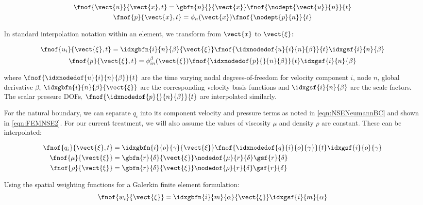 \begin{gather}
  \fnof{\vect{u}}{\vect{x},t}=\gbfn{n}{}{\vect{x}}\fnof{\nodept{\vect{u}}{n}}{t}\\
  \fnof{p}{\vect{x},t}=\phi_{n}({\vect{x}})\fnof{\nodept{p}{n}}{t}
\end{gather}

In standard interpolation notation within an element, we transform from $\vect{x}$ to $\vect{\xi}$:

\begin{gather}
  \fnof{u_{i}}{\vect{\xi},t}=\idxgbfn{i}{n}{\beta}{\vect{\xi}}
  \fnof{\idxnodedof{u}{i}{n}{\beta}}{t}\idxgsf{i}{n}{\beta}\\
  \fnof{p_{}}{\vect{\xi},t}=\phi_{in}^{\beta}({\vect{\xi}})
  \fnof{\idxnodedof{p}{}{n}{\beta}}{t}\idxgsf{i}{n}{\beta}
\end{gather}

where $\fnof{\idxnodedof{u}{i}{n}{\beta}}{t}$ are the time varying nodal degrees-of-freedom for velocity component $i$, node $n$, global derivative $\beta$, $\idxgbfn{i}{n}{\beta}{\vect{\xi}}$ are the corresponding velocity basis functions and $\idxgsf{i}{n}{\beta}$ are the scale factors. The scalar pressure DOFs, $\fnof{\idxnodedof{p}{}{n}{\beta}}{t}$ are interpolated similarly.

For the natural boundary, we can separate $q_i$ into its component velocity and pressure terms as noted in \ref{eqn:NSENeumannBC} and shown in \ref{eqn:FEMNSE2}. For our current treatment, we will also assume the values of viscosity $\mu$ and density $\rho$ are constant. These can be interpolated:

\begin{equation}
  \begin{split}
    \fnof{q_{i}}{\vect{\xi},t} &= \idxgbfn{i}{o}{\gamma}{\vect{\xi}}
      \fnof{\idxnodedof{q}{i}{o}{\gamma}}{t}\idxgsf{i}{o}{\gamma} \\
    \fnof{\mu}{\vect{\xi}} &=\gbfn{r}{\delta}{\vect{\xi}}
    \nodedof{\mu}{r}{\delta}\gsf{r}{\delta} \\
    \fnof{\rho}{\vect{\xi}} &=\gbfn{r}{\delta}{\vect{\xi}}\nodedof{\rho}{r}{\delta}
    \gsf{r}{\delta} \\
  \end{split}
\end{equation}

 Using the spatial weighting functions for a Galerkin finite element formulation:
\begin{equation}
  \fnof{w_{i}}{\vect{\xi}}=\idxgbfn{i}{m}{\alpha}{\vect{\xi}}\idxgsf{i}{m}{\alpha}
\end{equation}


